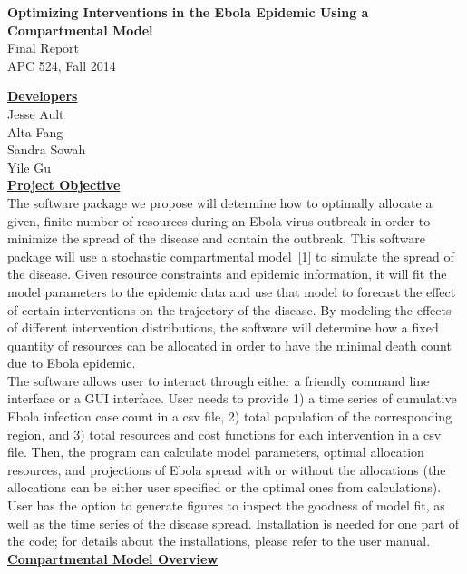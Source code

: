 \documentclass[11pt,letter]{article}
\begin{document}
\begin{center}
	\large\textbf{Optimizing Interventions in the Ebola Epidemic Using a Compartmental Model}\\
	\normalsize{Final Report\\APC 524, Fall 2014}
\end{center}

\underline{\textbf{Developers}}\vspace{0.5mm}\\Jesse Ault\\Alta Fang\\Sandra Sowah\\ Yile Gu\\

\underline{\textbf{Project Objective}}\vspace{0.5mm}\\
The software package we propose will determine how to optimally allocate a given, finite number of resources during an Ebola virus outbreak in order to minimize the spread of the disease and contain the outbreak. This software package will use a stochastic compartmental model~[1] to simulate the spread of the disease. Given resource constraints and epidemic information, it will fit the model parameters to the epidemic data and use that model to forecast the effect of certain interventions on the trajectory of the disease. By modeling the effects of different intervention distributions, the software will determine how a fixed quantity of resources can be allocated in order to have the minimal death count due to Ebola epidemic.\\

The software allows user to interact through either a friendly command line interface or a GUI interface. User needs to provide 1) a time series of cumulative Ebola infection case count in a csv file, 2) total population of the corresponding region, and 3) total resources and cost functions for each intervention in a csv file. Then, the program can calculate model parameters, optimal allocation resources, and projections of Ebola spread with or without the allocations (the allocations can be either user specified or the optimal ones from calculations). User has the option to generate figures to inspect the goodness of model fit, as well as the time series of the disease spread. Installation is needed for one part of the code; for details about the installations, please refer to the user manual. 
\\

\underline{\textbf{Compartmental Model Overview}}\vspace{0.5mm}\\
\end{document}
